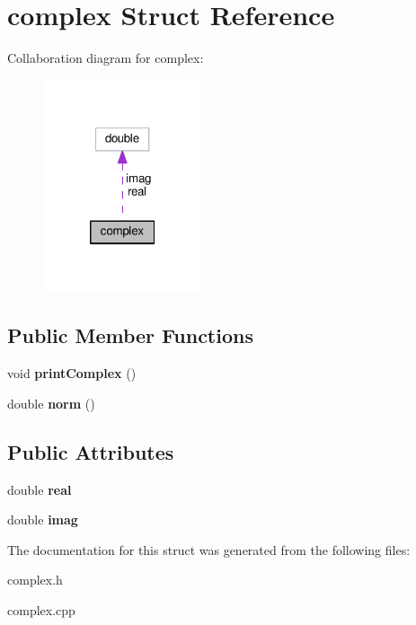 \hypertarget{structcomplex}{}\section{complex Struct Reference}
\label{structcomplex}


Collaboration diagram for complex\+:\nopagebreak
\begin{figure}[H]
\begin{center}
\leavevmode
\includegraphics[width=133pt]{db/d0a/structcomplex__coll__graph}
\end{center}
\end{figure}
\subsection*{Public Member Functions}
\begin{DoxyCompactItemize}
\item 
void {\bfseries print\+Complex} ()\hypertarget{structcomplex_aed36e4f758691608576d96ef396cc436}{}\label{structcomplex_aed36e4f758691608576d96ef396cc436}

\item 
double {\bfseries norm} ()\hypertarget{structcomplex_a81dd00af9a4f56a86bd242b31cb1f8a4}{}\label{structcomplex_a81dd00af9a4f56a86bd242b31cb1f8a4}

\end{DoxyCompactItemize}
\subsection*{Public Attributes}
\begin{DoxyCompactItemize}
\item 
double {\bfseries real}\hypertarget{structcomplex_a754edcb8ad10b6b22f6f642089571432}{}\label{structcomplex_a754edcb8ad10b6b22f6f642089571432}

\item 
double {\bfseries imag}\hypertarget{structcomplex_a17e7cf8707199cba0dcd7360dd98aa9f}{}\label{structcomplex_a17e7cf8707199cba0dcd7360dd98aa9f}

\end{DoxyCompactItemize}


The documentation for this struct was generated from the following files\+:\begin{DoxyCompactItemize}
\item 
complex.\+h\item 
complex.\+cpp\end{DoxyCompactItemize}
